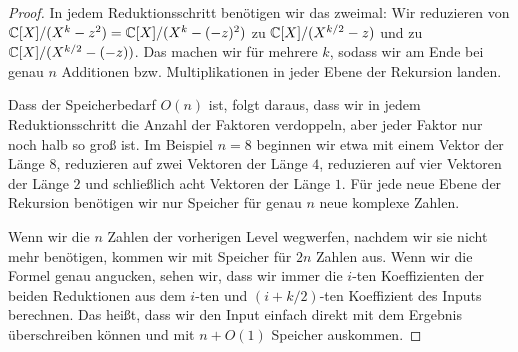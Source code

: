 \begin{proof}
    \medskip
    In jedem Reduktionsschritt benötigen wir das zweimal: Wir reduzieren von $\mathbb{C}[X]/(X^k-z^2) = \mathbb{C}[X]/(X^k-(-z)^2)$ zu $\mathbb{C}[X]/(X^{k/2}-z)$ und zu $\mathbb{C}[X]/(X^{k/2}-(-z))$.
    Das machen wir für mehrere $k$, sodass wir am Ende bei genau $n$ Additionen bzw. Multiplikationen in jeder Ebene der Rekursion landen.

    \medskip
    Dass der Speicherbedarf $O(n)$ ist, folgt daraus, dass wir in jedem Reduktionsschritt die Anzahl der Faktoren verdoppeln, aber jeder Faktor nur noch halb so groß ist. Im Beispiel $n=8$ beginnen wir etwa mit einem Vektor der Länge $8$, reduzieren auf zwei Vektoren der Länge $4$, reduzieren auf vier Vektoren der Länge $2$ und schließlich acht Vektoren der Länge $1$. Für jede neue Ebene der Rekursion benötigen wir nur Speicher für genau $n$ neue komplexe Zahlen.

    Wenn wir die $n$ Zahlen der vorherigen Level wegwerfen, nachdem wir sie nicht mehr benötigen, kommen wir mit Speicher für $2n$ Zahlen aus. Wenn wir die Formel genau angucken, sehen wir, dass wir immer die $i$-ten Koeffizienten der beiden Reduktionen aus dem $i$-ten und $(i+k/2)$-ten Koeffizient des Inputs berechnen. Das heißt, dass wir den Input einfach direkt mit dem Ergebnis überschreiben können und mit $n+O(1)$ Speicher auskommen.
\end{proof}